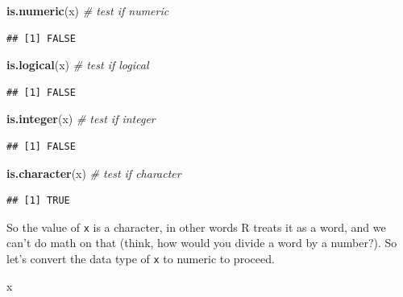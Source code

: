 \documentclass[
]{book}
\newenvironment{Shaded}{\begin{snugshade}}{\end{snugshade}}
\newcommand{\CommentTok}[1]{\textcolor[rgb]{0.56,0.35,0.01}{\textit{#1}}}
\newcommand{\FunctionTok}[1]{\textcolor[rgb]{0.13,0.29,0.53}{\textbf{#1}}}
\newcommand{\NormalTok}[1]{#1}
\begin{document}
\begin{Shaded}
\begin{Highlighting}[]
\FunctionTok{is.numeric}\NormalTok{(x)   }\CommentTok{\# test if numeric }
\end{Highlighting}
\end{Shaded}

\begin{verbatim}
## [1] FALSE
\end{verbatim}

\begin{Shaded}
\begin{Highlighting}[]
\FunctionTok{is.logical}\NormalTok{(x)   }\CommentTok{\# test if logical}
\end{Highlighting}
\end{Shaded}

\begin{verbatim}
## [1] FALSE
\end{verbatim}

\begin{Shaded}
\begin{Highlighting}[]
\FunctionTok{is.integer}\NormalTok{(x)   }\CommentTok{\# test if integer }
\end{Highlighting}
\end{Shaded}

\begin{verbatim}
## [1] FALSE
\end{verbatim}

\begin{Shaded}
\begin{Highlighting}[]
\FunctionTok{is.character}\NormalTok{(x) }\CommentTok{\# test if character}
\end{Highlighting}
\end{Shaded}

\begin{verbatim}
## [1] TRUE
\end{verbatim}

So the value of \texttt{x} is a character, in other words R treats it as a word, and we can't do math on that (think, how would you divide a word by a number?). So let's convert the data type of \texttt{x} to numeric to proceed.

\begin{Shaded}
\begin{Highlighting}[]
\NormalTok{x }
\end{Highlighting}
\end{Shaded}
\end{document}

